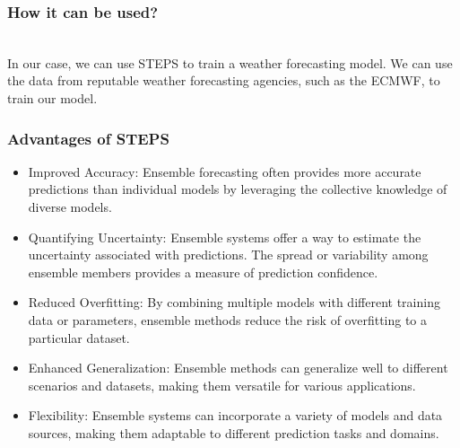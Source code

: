\documentclass[../paper.tex]{subfiles}
\begin{document}
    \subsubsection{How it can be used?}
        \hfill\\
        In our case, we can use STEPS to train a weather forecasting model.
        We can use the data from reputable weather forecasting agencies, such as the ECMWF, to train our model.
    \subsubsection{Advantages of STEPS}
        \begin{itemize}
            \item Improved Accuracy:
            Ensemble forecasting often provides more accurate predictions than individual models
            by leveraging the collective knowledge of diverse models.

            \item Quantifying Uncertainty: Ensemble systems offer a way to estimate the uncertainty associated with predictions.
            The spread or variability among ensemble members provides a measure of prediction confidence.

            \item Reduced Overfitting:
            By combining multiple models with different training data or parameters,
            ensemble methods reduce the risk of overfitting to a particular dataset.

            \item Enhanced Generalization: Ensemble methods can generalize well to different scenarios and datasets,
            making them versatile for various applications.

            \item Flexibility: Ensemble systems can incorporate a variety of models and data sources,
            making them adaptable to different prediction tasks and domains.
        \end{itemize}
\end{document}
